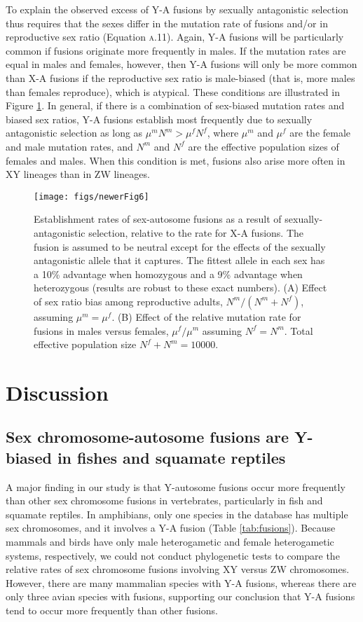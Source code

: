 To explain the observed excess of Y-A fusions by sexually antagonistic selection thus requires that the sexes differ in the mutation rate of fusions and/or in reproductive sex ratio (Equation \textsc{a.11}). Again, Y-A fusions will be particularly common if fusions originate more frequently in males. If the mutation rates are equal in males and females, however, then Y-A fusions will only be more common than X-A fusions if the reproductive sex ratio is male-biased (that is, more males than females reproduce), which is atypical. These conditions are illustrated in Figure \ref{fig:fuse-sa}. In general, if there is a combination of sex-biased mutation rates and biased sex ratios, Y-A fusions establish most frequently due to sexually antagonistic selection as long as $\mu^m N^m > \mu^fN^f$, where $\mu^m$ and $\mu^f$ are the female and male mutation rates, and $N^m$ and $N^f$ are the effective population sizes of females and males. When this condition is met, fusions also arise more often in XY lineages than in ZW lineages.

\begin{figure}
\centering
\texttt{[image: figs/newerFig6]}
\caption[Establishment rates of sex-autosome fusions under SA selection]{Establishment rates of sex-autosome fusions as a result of sexually-antagonistic selection, relative to the rate for X-A fusions. The fusion is assumed to be neutral except for the effects of the sexually antagonistic allele that it captures. The fittest allele in each sex has a 10\% advantage when homozygous and a 9\% advantage when heterozygous (results are robust to these exact numbers). (A) Effect of sex ratio bias among reproductive adults, $N^m/(N^m + N^f)$, assuming $\mu^m=\mu^f$. (B) Effect of the relative mutation rate for fusions in males versus females, $\mu^f/\mu^m$ assuming $N^f=N^m$. Total effective population size $N^f+N^m=\text{10000}$.}
\label{fig:fuse-sa}
\end{figure}

\section{Discussion}

\subsection{Sex chromosome-autosome fusions are Y-biased in fishes and squamate reptiles}

A major finding in our study is that Y-autosome fusions occur more frequently than other sex chromosome fusions in vertebrates, particularly in fish and squamate reptiles. In amphibians, only one species in the database has multiple sex chromosomes, and it involves a Y-A fusion (Table \ref{tab:fusions}). Because mammals and birds have only male heterogametic and female heterogametic systems, respectively, we could not conduct phylogenetic tests to compare the relative rates of sex chromosome fusions involving XY versus ZW chromosomes. However, there are many mammalian species with Y-A fusions, whereas there are only three avian species with fusions, supporting our conclusion that Y-A fusions tend to occur more frequently than other fusions. 

